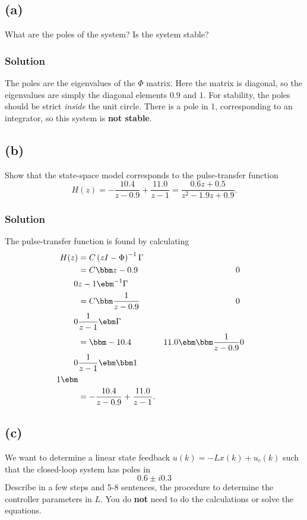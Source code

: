 \documentclass[a4paper]{scrartcl}
\begin{document}
\subsection*{(a)}
\label{sec-3-1}
What are the poles of the system? Is the system stable?

\subsubsection*{Solution}
\label{sec-3-1-1}
The poles are the eigenvalues of the $\Phi$ matrix. Here the matrix is diagonal, so the eigenvalues are simply the diagonal elements $0.9$ and $1$. For stability, the poles should be strict \emph{inside} the unit circle. There is a pole in 1, corresponding to an integrator, so this system is \textbf{not stable}.

\subsection*{(b)}
\label{sec-3-2}
Show that the state-space model corresponds to the pulse-transfer function
\[ H(z) = -\frac{10.4}{z-0.9} + \frac{11.0}{z-1} = \frac{0.6z + 0.5}{z^2 - 1.9z + 0.9}. \]

\subsubsection*{Solution}
\label{sec-3-2-1}
The pulse-transfer function is found by calculating
\begin{equation*}
  \begin{split}
 H(z) &= C \left( zI - \Phi\right)^{-1} \Gamma\\
      &= C \bbm z-0.9 & 0\\0 & z-1 \ebm ^{-1} \Gamma \\
      &= C \bbm \frac{1}{z-0.9} & 0\\ 0 & \frac{1}{z-1} \ebm \Gamma \\
      &= \bbm -10.4 & 11.0 \ebm \bbm \frac{1}{z-0.9} & 0\\ 0 & \frac{1}{z-1} \ebm \bbm 1\\1\ebm \\
      &= - \frac{10.4}{z-0.9} + \frac{11.0}{z-1}.
  \end{split}
 \end{equation*}


\subsection*{(c)}
\label{sec-3-3}
We want to determine a linear state feedback $u(k) = -Lx(k) + u_c(k)$ such that the closed-loop system has poles in \[ 0.6 \pm i0.3 \] Describe in a few steps and 5-8 sentences, the procedure to determine the controller parameters in $L$. You do \textbf{not} need to do the calculations or solve the equations. 
\end{document}
